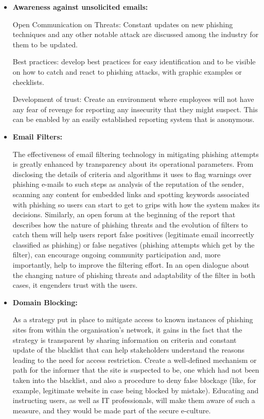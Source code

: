 \begin{itemize}
     \item \textbf{Awareness against unsolicited emails:  } 
     
     Open Communication on Threats: Constant updates on new phishing techniques and any other notable attack are discussed among the industry for them to be updated.
     
Best practices: develop best practices for easy identification and to be visible on how to catch and react to phishing attacks, with graphic examples or checklists.

Development of trust: Create an environment where employees will not have any fear of revenge for reporting any insecurity that they might suspect. This can be enabled by an easily established reporting system that is anonymous.

\item \textbf{Email Filters:} 

The effectiveness of email filtering technology in mitigating phishing attempts is greatly enhanced by transparency about its operational parameters. From disclosing the details of criteria and algorithms it uses to flag warnings over phishing e-mails to such steps as analysis of the reputation of the sender, scanning any content for embedded links and spotting keywords associated with phishing so users can start to get to grips with how the system makes its decisions. Similarly, an open forum at the beginning of the report that describes how the nature of phishing threats and the evolution of filters to catch them will help users report false positives (legitimate email incorrectly classified as phishing) or false negatives (phishing attempts which get by the filter), can encourage ongoing community participation and, more importantly, help to improve the filtering effort. In an open dialogue about the changing nature of phishing threats and adaptability of the filter in both cases, it engenders trust with the users.

\item \textbf{Domain Blocking:} 

As a strategy put in place to mitigate access to known instances of phishing sites from within the organisation's network, it gains in the fact that the strategy is transparent by sharing information on criteria and constant update of the blacklist that can help stakeholders understand the reasons leading to the need for access restriction. Create a well-defined mechanism or path for the informer that the site is suspected to be, one which had not been taken into the blacklist, and also a procedure to deny false blockage (like, for example, legitimate website in case being blocked by mistake). Educating and instructing users, as well as IT professionals, will make them aware of such a measure, and they would be made part of the secure e-culture.


\end{itemize}
